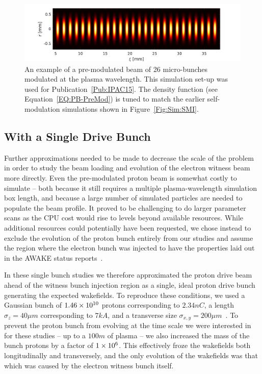 \begin{figure}[hbt]
    \centering
    \includegraphics[width=0.9375\linewidth,trim={0mm 0mm 0mm 0mm},clip]{figures/PBPreMod}
    \caption{\label{Fig:PBPreMod}
        An example of a pre-modulated beam of 26 micro-bunches modulated at the plasma wavelength.
        This simulation set-up was used for Publication~\ref{Pub:IPAC15}.
        The density function (see Equation~\ref{EQ:PB-PreMod}) is tuned to match the earlier self-modulation simulations shown in Figure~\ref{Fig:Sim:SMI}.
    }
\end{figure}


\subsection{With a Single Drive Bunch}
\label{Sim:PBSingle}

Further approximations needed to be made to decrease the scale of the problem in order to study the beam loading and evolution of the electron witness beam more directly.
Even the pre-modulated proton beam is somewhat costly to simulate -- both because it still requires a multiple plasma-wavelength simulation box length, and because a large number of simulated particles are needed to populate the beam profile.
It proved to be challenging to do larger parameter scans as the CPU cost would rise to levels beyond available resources.
While additional resources could potentially have been requested, we chose instead to exclude the evolution of the proton bunch entirely from our studies and assume the region where the electron bunch was injected to have the properties laid out in the AWAKE status reports~\cite{awake_collaboration:2016}.

In these single bunch studies we therefore approximated the proton drive beam ahead of the witness bunch injection region as a single, ideal proton drive bunch generating the expected wakefields.
To reproduce these conditions, we used a Gaussian bunch of $1.46\times 10^{10}$ protons corresponding to $2.34\unit{nC}$, a length $\sigma_{z} = 40\unit{\mu m}$ corresponding to $7\unit{kA}$, and a transverse size $\sigma_{x,y}=200\unit{\mu m}$~\cite{berglyd_olsen:2018}.
To prevent the proton bunch from evolving at the time scale we were interested in for these studies -- up to a $100\unit{m}$ of plasma -- we also increased the mass of the bunch protons by a factor of $1\times 10^{6}$.
This effectively froze the wakefields both longitudinally and transversely, and the only evolution of the wakefields was that which was caused by the electron witness bunch itself.

